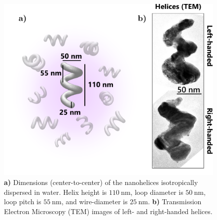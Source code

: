 \begin{figure}[htb!]	
    \centering	
    \includegraphics[scale=1]{./figures/results/HRS/sample_schematic.pdf}
    \caption{\label{fig:results:HRS:sample_schematic}
    \textbf{a)} Dimensions (center-to-center) of the nanohelices isotropically dispersed in water. Helix height is $\SI{110}{\nano\m}$, loop diameter is $\SI{50}{\nano\m}$, loop pitch is $\SI{55}{\nano\m}$, and wire-diameter is $\SI{25}{\nano\m}$. \textbf{b)} Transmission Electron Microscopy (TEM) images of left- and right-handed helices. }	
\end{figure}

